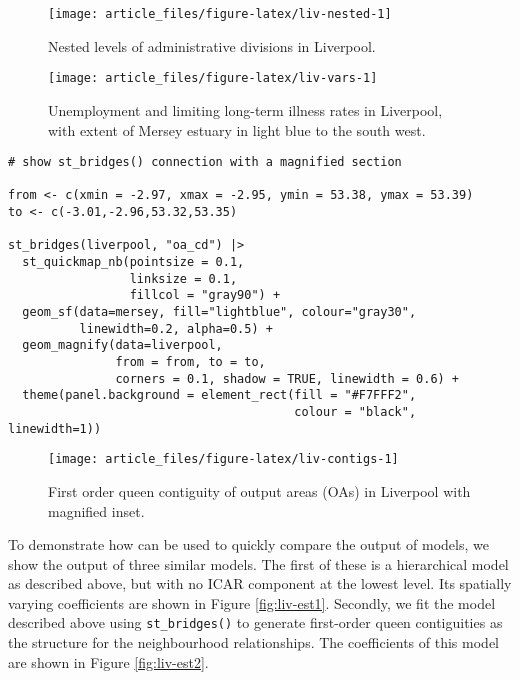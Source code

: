 \begin{figure}

{\centering \texttt{[image: article\_files/figure-latex/liv-nested-1]} 

}

\caption{Nested levels of administrative divisions in Liverpool. }\label{fig:liv-nested}
\end{figure}

\begin{figure}

{\centering \texttt{[image: article\_files/figure-latex/liv-vars-1]} 

}

\caption{Unemployment and limiting long-term illness rates in Liverpool, with extent of Mersey estuary in light blue to the south west. }\label{fig:liv-vars}
\end{figure}

\begin{verbatim}
# show st_bridges() connection with a magnified section

from <- c(xmin = -2.97, xmax = -2.95, ymin = 53.38, ymax = 53.39)
to <- c(-3.01,-2.96,53.32,53.35)

st_bridges(liverpool, "oa_cd") |> 
  st_quickmap_nb(pointsize = 0.1,
                 linksize = 0.1,
                 fillcol = "gray90") +  
  geom_sf(data=mersey, fill="lightblue", colour="gray30", 
          linewidth=0.2, alpha=0.5) + 
  geom_magnify(data=liverpool, 
               from = from, to = to, 
               corners = 0.1, shadow = TRUE, linewidth = 0.6) + 
  theme(panel.background = element_rect(fill = "#F7FFF2",
                                        colour = "black", linewidth=1))
\end{verbatim}

\begin{figure}

{\centering \texttt{[image: article\_files/figure-latex/liv-contigs-1]} 

}

\caption{First order queen contiguity of output areas (OAs) in Liverpool with magnified inset. }\label{fig:liv-contigs}
\end{figure}

To demonstrate how  can be used to quickly compare the output of models, we show the output of three similar models. The first of these is a hierarchical model as described above, but with no ICAR component at the lowest level. Its spatially varying coefficients are shown in Figure \ref{fig:liv-est1}. Secondly, we fit the model described above using \texttt{st\_bridges()} to generate first-order queen contiguities as the structure for the neighbourhood relationships. The coefficients of this model are shown in Figure \ref{fig:liv-est2}.


